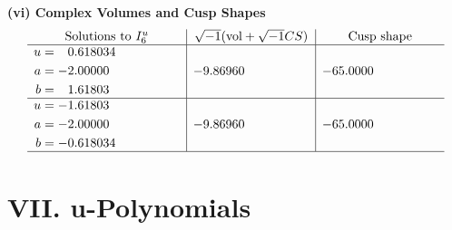 \documentclass[1p]{elsarticle_modified}
\theoremstyle{definition}
\newcommand{\I}{\sqrt{-1}}
\begin{document}
\newpage\flushleft \textbf{(vi) Complex Volumes and Cusp Shapes}
$$\begin{array}{c|c|c}  
\text{Solutions to }I^u_{6}& \I (\text{vol} + \sqrt{-1}CS) & \text{Cusp shape}\\
 \hline 
\begin{aligned}
u &= \phantom{-}0.618034\phantom{ +0.000000I} \\
a &= -2.00000\phantom{ +0.000000I} \\
b &= \phantom{-}1.61803\phantom{ +0.000000I}\end{aligned}
 & -9.86960\phantom{ +0.000000I} & -65.0000\phantom{ +0.000000I} \\ \hline\begin{aligned}
u &= -1.61803\phantom{ +0.000000I} \\
a &= -2.00000\phantom{ +0.000000I} \\
b &= -0.618034\phantom{ +0.000000I}\end{aligned}
 & -9.86960\phantom{ +0.000000I} & -65.0000\phantom{ +0.000000I}\\
 \hline 
 \end{array}$$\newpage
\newpage\renewcommand{\arraystretch}{1}
\centering \section*{ VII. u-Polynomials}
\end{document}
